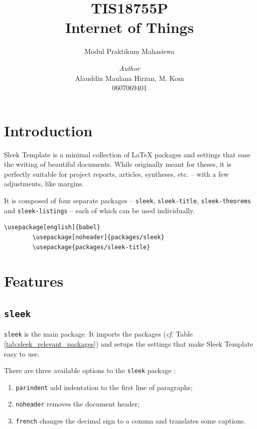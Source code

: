 \documentclass[a4paper, 12pt]{report}
\institute{Universitas Semarang}
\title{TIS18755P \\ Internet of Things}
\subtitle{Modul Praktikum Mahasiswa}
\author{\textit{Author}\\Alauddin Maulana Hirzan, M. Kom\\0607069401}
\date{}
\begin{document}
    \maketitle
    \romantableofcontents

    \chapter{Introduction}

    Sleek Template is a minimal collection of \LaTeX{} packages and settings that ease the writing of beautiful documents. While originally meant for theses, it is perfectly suitable for project reports, articles, syntheses, etc. -- with a few adjustments, like margins.

    It is composed of four separate packages -- \texttt{sleek}, \texttt{sleek-title}, \texttt{sleek-theorems} and \texttt{sleek-listings} -- each of which can be used individually.

    \begin{lstlisting}[style=latexFrameTB, caption={Example of Sleek Template packages usage.}, gobble=8]
        \usepackage[english]{babel}
        \usepackage[noheader]{packages/sleek}
        \usepackage{packages/sleek-title}
    \end{lstlisting}


    \chapter{Features}

    \section{\texttt{sleek}}

    \texttt{sleek} is the main package. It imports the packages (\emph{cf.} Table \ref{tab:sleek_relevant_packages}) and setups the settings that make Sleek Template easy to use.

    There are three available options to the \texttt{sleek} package :

    \begin{enumerate}[noitemsep]
        \item \texttt{parindent} add indentation to the first line of paragraphs;
        \item \texttt{noheader} removes the document header;
        \item \texttt{french} changes the decimal sign to a comma and translates some captions.
    \end{enumerate}
\end{document}
